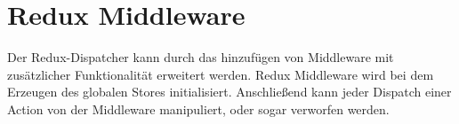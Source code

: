 \section{Redux Middleware}
\label{sec:f_redux_middleware}

Der Redux-Dispatcher kann durch das hinzufügen von Middleware mit zusätzlicher
Funktionalität erweitert werden.  Redux Middleware wird bei dem Erzeugen des
globalen Stores initialisiert.  Anschließend kann jeder Dispatch einer Action
von der Middleware manipuliert, oder sogar verworfen werden.




